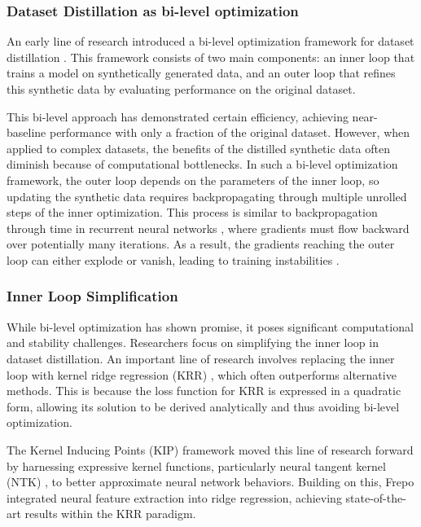 \subsubsection{Dataset Distillation as bi-level optimization}
An early line of research introduced a bi-level optimization framework for dataset distillation \cite{wang2018dataset}. This framework consists of two main components: an inner loop that trains a model on synthetically generated data, and an outer loop that refines this synthetic data by evaluating performance on the original dataset.

This bi-level approach has demonstrated certain efficiency, achieving near-baseline performance with only a fraction of the original dataset. However, when applied to complex datasets, the benefits of the distilled synthetic data often diminish because of computational bottlenecks. In such a bi-level optimization framework, the outer loop depends on the parameters of the inner loop, so updating the synthetic data requires backpropagating through multiple unrolled steps of the inner optimization. This process is similar to backpropagation through time \cite{werbos1990backpropagation} in recurrent neural networks \cite{yu2019review}, where gradients must flow backward over potentially many iterations. As a result, the gradients reaching the outer loop can either explode or vanish, leading to training instabilities \cite{pascanu2013difficulty, vicol2021unbiased}.

\subsubsection{Inner Loop Simplification} 
While bi-level optimization has shown promise, it poses significant computational and stability challenges. Researchers focus on simplifying the inner loop in dataset distillation. An important line of research involves replacing the inner loop with kernel ridge regression (KRR) \citep{nguyen2020dataset, nguyen2021dataset, zhou2022dataset, loo2022efficient}, which often outperforms alternative methods. This is because the loss function for KRR is expressed in a quadratic form, allowing its solution to be derived analytically and thus avoiding bi-level optimization.

The Kernel Inducing Points (KIP) framework \cite{nguyen2020dataset} moved this line of research forward by harnessing expressive kernel functions, particularly neural tangent kernel (NTK) \cite{jacot2018neural}, to better approximate neural network behaviors. Building on this, Frepo \cite{zhou2022dataset} integrated neural feature extraction into ridge regression, achieving state-of-the-art results within the KRR paradigm.

